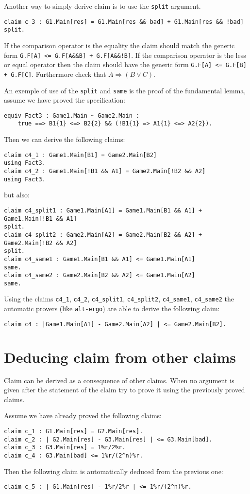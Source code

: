 Another way to simply derive claim is to use the \verb+split+ argument.
\begin{verbatim}
claim c_3 : G1.Main[res] = G1.Main[res && bad] + G1.Main[res && !bad]
split.
\end{verbatim}
If the comparison operator is the equality the claim should match the
generic form \verb?G.F[A] <= G.F[A&&B] + G.F[A&&!B]?.
If the comparison operator is the less or equal operator then
the claim should have the generic form \verb?G.F[A] <= G.F[B] + G.F[C]?.
Furthermore \easycrypt check that $A \Rightarrow (B \lor C)$.

An exemple of use of the \verb+split+ and \verb+same+ is the proof of the
fundamental lemma, assume we have proved the specification:
\begin{verbatim}
equiv Fact3 : Game1.Main ~ Game2.Main : 
    true ==> B1{1} <=> B2{2} && (!B1{1} => A1{1} <=> A2{2}).
\end{verbatim}
Then we can derive the following claims:
\begin{verbatim}
claim c4_1 : Game1.Main[B1] = Game2.Main[B2]
using Fact3.
claim c4_2 : Game1.Main[!B1 && A1] = Game2.Main[!B2 && A2]
using Fact3.
\end{verbatim}
but also:
\begin{verbatim}
claim c4_split1 : Game1.Main[A1] = Game1.Main[B1 && A1] + Game1.Main[!B1 && A1]
split.
claim c4_split2 : Game2.Main[A2] = Game2.Main[B2 && A2] + Game2.Main[!B2 && A2]
split.
claim c4_same1 : Game1.Main[B1 && A1] <= Game1.Main[A1]
same.
claim c4_same2 : Game2.Main[B2 && A2] <= Game1.Main[A2]
same. 
\end{verbatim}
Using the claims \verb+c4_1+, \verb+c4_2+, \verb+c4_split1+, \verb+c4_split2+,
\verb+c4_same1+, \verb+c4_same2+ the automatic provers (like \verb+alt-ergo+)
are able to derive the following claim:
\begin{verbatim}
claim c4 : |Game1.Main[A1] - Game2.Main[A2] | <= Game2.Main[B2].
\end{verbatim}





\section{Deducing claim from other claims}
Claim can be derived as a consequence of other claims.
When no argument is given after the statement of the claim \easycrypt
try to prove it using the previously proved claims.

Assume we have already proved the following claims:
\begin{verbatim}
claim c_1 : G1.Main[res] = G2.Main[res].
claim c_2 : | G2.Main[res] - G3.Main[res] | <= G3.Main[bad].
claim c_3 : G3.Main[res] = 1%r/2%r.
claim c_4 : G3.Main[bad] <= 1%r/(2^n)%r.
\end{verbatim}
Then the following claim is automatically deduced from the previous one:
\begin{verbatim}
claim c_5 : | G1.Main[res] - 1%r/2%r | <= 1%r/(2^n)%r.
\end{verbatim}

